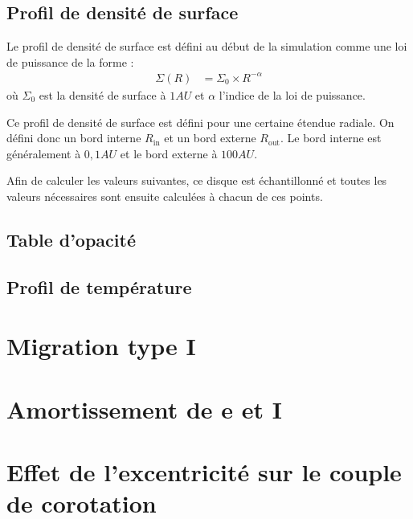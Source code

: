 \subsection{Profil de densité de surface}
Le profil de densité de surface est défini au début de la simulation comme une loi de puissance de la forme :
\begin{align}
\Sigma(R) &= \Sigma_0 \times R^{-\alpha}
\end{align}
où $\Sigma_0$ est la densité de surface à $1\unit{AU}$ et $\alpha$ l'indice de la loi de puissance. 

Ce profil de densité de surface est défini pour une certaine étendue radiale. On défini donc un bord interne $R_\text{in}$ et un bord externe $R_\text{out}$. Le bord interne est généralement à $0,1\unit{AU}$ et le bord externe à $100\unit{AU}$. 

Afin de calculer les valeurs suivantes, ce disque est échantillonné et toutes les valeurs nécessaires sont ensuite calculées à chacun de ces points. 

\subsection{Table d'opacité}
\subsection{Profil de température}
\section{Migration type I}
\section{Amortissement de e et I}
\section{Effet de l'excentricité sur le couple de corotation}
